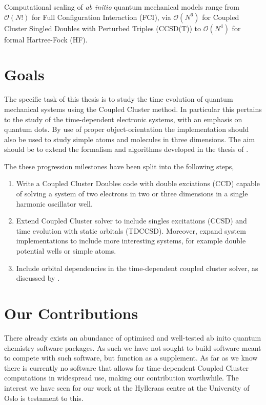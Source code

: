     Computational scaling of \emph{ab initio} quantum mechanical models range from 
    $\mathcal{O}(N!)$ for Full Configuration Interaction (FCI), via $\mathcal{O}(N^6)$ 
    for Coupled Cluster Singled Doubles with Perturbed Triples (CCSD(T)) to 
    $\mathcal{O}(N^4)$ for formal Hartree-Fock (HF)\cite{ratcliff2017challenges}.


\section{Goals}

    The specific task of this thesis is to study the time evolution of quantum 
    mechanical systems using the Coupled Cluster method. In particular this 
    pertains to the study of the time-dependent electronic systems, with an emphasis 
    on quantum dots. By use of proper object-orientation the implementation should 
    also be used to study simple atoms and molecules in three dimensions.
    The aim should be to 
    extend the formalism and algorithms developed in the thesis of 
    \citeauthor{haakon2017time}\cite{haakon2017time}.

    The these progression milestones have been split into the following steps,

    \begin{enumerate}
        \item Write a Coupled Cluster Doubles code with double exciations (CCD)
            capable of solving a system of two electrons in two or three dimensions 
            in a single harmonic oscillator well.
        \item Extend Coupled Cluster solver to include singles excitations (CCSD)
            and time evolution with static orbitals (TDCCSD). Moreover, expand system
            implementations to include more interesting systems, for example double
            potential wells or simple atoms.
        \item Include orbital dependencies in the time-dependent coupled cluster solver, as 
            discussed by \citeauthor{kvaal2012ab}\cite{kvaal2012ab}.
    \end{enumerate}

\section{Our Contributions}

    There already exists an abundance of optimised and well-tested ab inito quantum chemistry 
    software packages. As such we have not sought to build software meant to compete 
    with such software, but function as a supplement. As far as we know 
    there is currently no software that allows for time-dependent Coupled Cluster 
    computations in widespread use, making our contribution worthwhile. The interest 
    we have seen for our work at the Hylleraas centre at the University of Oslo 
    is testament to this\cite{islandwind2019numerically}.


